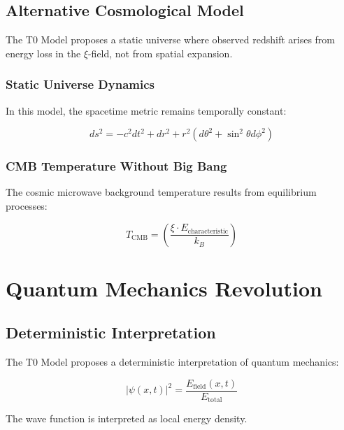 \documentclass[12pt,a4paper]{report}
\begin{document}
	\section{Alternative Cosmological Model}
	
	\begin{revolutionary}
		The T0 Model proposes a static universe where observed redshift arises from energy loss in the $\xi$-field, not from spatial expansion.
	\end{revolutionary}
	
	\subsection{Static Universe Dynamics}
	
	In this model, the spacetime metric remains temporally constant:
	
	\begin{equation}
		ds^2 = -c^2 dt^2 + dr^2 + r^2(d\theta^2 + \sin^2\theta d\phi^2)
	\end{equation}
	
	\subsection{CMB Temperature Without Big Bang}
	
	The cosmic microwave background temperature results from equilibrium processes:
	
	\begin{equation}
		T_{\text{CMB}} = \left(\frac{\xi \cdot E_{\text{characteristic}}}{k_B}\right)
	\end{equation}
	
	\chapter{Quantum Mechanics Revolution}
	
	\section{Deterministic Interpretation}
	
	The T0 Model proposes a deterministic interpretation of quantum mechanics:
	
	\begin{equation}
		|\psi(x,t)|^2 = \frac{E_{\text{field}}(x,t)}{E_{\text{total}}}
	\end{equation}
	
	The wave function is interpreted as local energy density.
	
\end{document}
